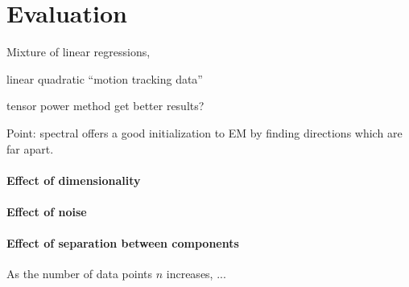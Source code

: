 \section{Evaluation}
\label{sec:evaluation}

Mixture of linear regressions, 

linear 
quadratic
``motion tracking data''

tensor power method get better results?

Point: spectral offers a good initialization to EM by finding directions which
are far apart.

\paragraph{Effect of dimensionality}

\paragraph{Effect of noise}

\paragraph{Effect of separation between components}

As the number of data points $n$ increases, ...
